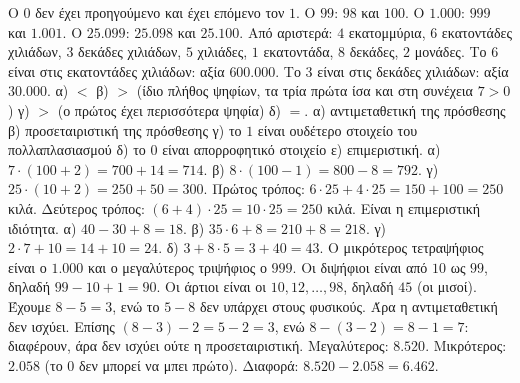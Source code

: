 Ο $0$ δεν έχει προηγούμενο και έχει επόμενο τον $1$. Ο $99$: $98$ και $100$. Ο $1.000$: $999$ και $1.001$. Ο $25.099$: $25.098$ και $25.100$.
 Από αριστερά: $4$ εκατομμύρια, $6$ εκατοντάδες χιλιάδων, $3$ δεκάδες χιλιάδων, $5$ χιλιάδες, $1$ εκατοντάδα, $8$ δεκάδες, $2$ μονάδες. Το $6$ είναι στις εκατοντάδες χιλιάδων: αξία $600.000$. Το $3$ είναι στις δεκάδες χιλιάδων: αξία $30.000$.
 α) $<$ β) $>$ (ίδιο πλήθος ψηφίων, τα τρία πρώτα ίσα και στη συνέχεια $7>0$) γ) $>$ (ο πρώτος έχει περισσότερα ψηφία) δ) $=$.
 α) αντιμεταθετική της πρόσθεσης β) προσεταιριστική της πρόσθεσης γ) το $1$ είναι ουδέτερο στοιχείο του πολλαπλασιασμού δ) το $0$ είναι απορροφητικό στοιχείο ε) επιμεριστική.
 α) $7\cdot(100+2)=700+14=714$. β) $8\cdot(100-1)=800-8=792$. γ) $25\cdot(10+2)=250+50=300$.
 Πρώτος τρόπος: $6\cdot 25+4\cdot 25=150+100=250$ κιλά. Δεύτερος τρόπος: $(6+4)\cdot 25=10\cdot 25=250$ κιλά. Είναι η επιμεριστική ιδιότητα.
 α) $40-30+8=18$. β) $35\cdot 6+8=210+8=218$. γ) $2\cdot 7+10=14+10=24$. δ) $3+8\cdot 5=3+40=43$.
 Ο μικρότερος τετραψήφιος είναι ο $1.000$ και ο μεγαλύτερος τριψήφιος ο $999$. Οι διψήφιοι είναι από $10$ ως $99$, δηλαδή $99-10+1=90$. Οι άρτιοι είναι οι $10,12,\dots,98$, δηλαδή $45$ (οι μισοί).
 Έχουμε $8-5=3$, ενώ το $5-8$ δεν υπάρχει στους φυσικούς. Άρα η αντιμεταθετική δεν ισχύει. Επίσης $(8-3)-2=5-2=3$, ενώ $8-(3-2)=8-1=7$: διαφέρουν, άρα δεν ισχύει ούτε η προσεταιριστική.
 Μεγαλύτερος: $8.520$. Μικρότερος: $2.058$ (το $0$ δεν μπορεί να μπει πρώτο). Διαφορά: $8.520-2.058=6.462$.
